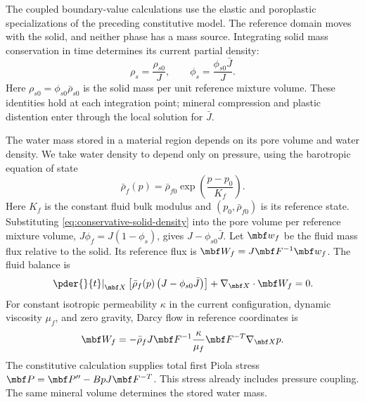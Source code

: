 The coupled boundary-value calculations use the elastic and poroplastic
specializations of the preceding constitutive model.  The reference domain
moves with the solid, and neither phase has a mass source.  Integrating
solid mass conservation in time determines its current partial density:
\begin{equation}
 \rho_s=\frac{\rho_{s0}}{J},\qquad
 \phi_s=\frac{\phi_{s0}\bar J}{J}.
 \label{eq:conservative-solid-density}
\end{equation}
Here \(\rho_{s0}=\phi_{s0}\bar\rho_{s0}\) is the solid mass per unit
reference mixture volume.  These identities hold at each integration point;
mineral compression and plastic distention enter through the local solution
for \(\bar J\).

The water mass stored in a material region depends on its pore volume
and water density.  We take water density to depend only on pressure,
using the barotropic equation of state
\begin{equation}
 \bar\rho_f(p)=\bar\rho_{f0}
 \exp\left(\frac{p-p_0}{K_f}\right).
 \label{eq:barotropic-fluid-density}
\end{equation}
Here \(K_f\) is the constant fluid bulk modulus and
\((p_0,\bar\rho_{f0})\) is its reference state.  Substituting
\eqref{eq:conservative-solid-density} into the pore volume per reference
mixture volume, \(J\phi_f=J(1-\phi_s)\), gives
\(J-\phi_{s0}\bar J\).  Let \(\mbf w_f\)
be the fluid mass flux relative to the solid.  Its reference flux is
\(\mbf W_f=J\mbf F^{-1}\mbf w_f\).  The fluid balance is
\begin{equation}
 \left.\pder{}{t}\right|_{\mbf X}
 \left[\bar\rho_f(p)\left(J-\phi_{s0}\bar J\right)\right]
 +\nabla_{\mbf X}\mathbin{\cdot}\mbf W_f=0.
 \label{eq:reference-fluid-mass-balance}
\end{equation}
For constant isotropic permeability \(\kappa\) in the current configuration,
dynamic viscosity \(\mu_f\), and zero gravity, Darcy flow in reference
coordinates is
\begin{equation}
 \mbf W_f=-\bar\rho_fJ\mbf F^{-1}
 \frac{\kappa}{\mu_f}\mbf F^{-T}\nabla_{\mbf X}p.
 \label{eq:reference-darcy-flux}
\end{equation}
The constitutive calculation supplies total first Piola stress
\(\mbf P=\mbf P^{\prime\prime}-BpJ\mbf F^{-T}\).
This stress already includes pressure coupling.  The same mineral volume
determines the stored water mass.


